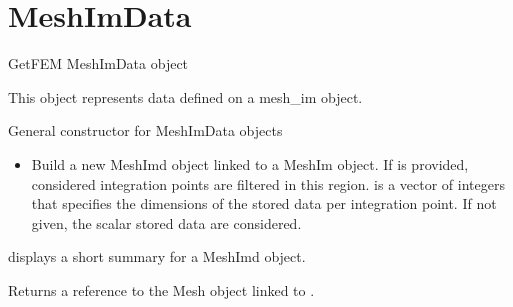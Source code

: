 \documentclass[a4paper,11pt,english]{sphinxmanual}
\begin{document}
\section{MeshImData}
\label{\detokenize{python/cmdref_MeshImData:meshimdata}}\label{\detokenize{python/cmdref_MeshImData::doc}}

\begin{fulllineitems}
\label{\detokenize{python/cmdref_MeshImData:getfem.MeshImData}}
GetFEM MeshImData object

This object represents data defined on a mesh\_im object.

General constructor for MeshImData objects
\begin{itemize}
\item {} 
Build a new MeshImd object linked to a MeshIm object. If  is
provided, considered integration points are filtered in this region.
 is a vector of integers that specifies the dimensions of the
stored data per integration point. If not given, the scalar stored
data are considered.

\end{itemize}

\begin{fulllineitems}
\label{\detokenize{python/cmdref_MeshImData:getfem.MeshImData.display}}
displays a short summary for a MeshImd object.

\end{fulllineitems}


\begin{fulllineitems}
\label{\detokenize{python/cmdref_MeshImData:getfem.MeshImData.linked_mesh}}
Returns a reference to the Mesh object linked to .

\end{fulllineitems}


\end{fulllineitems}
\end{document}
